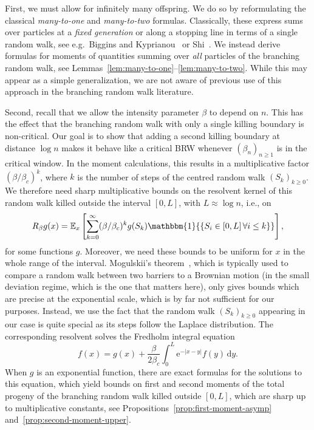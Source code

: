 \documentclass[a4paper, a4wide, 10pt, reqno]{amsart}
\theoremstyle{plain}
\theoremstyle{definition}
\numberwithin{equation}{section}
\newcommand{\E}{\mathbb E}
\newcommand{\re}{{\mathrm e}}
\newcommand{\Ind}[1]{\mathbbm{1}{\{#1\}}}
\newcommand{\rd}{\mathrm{d}}
\begin{document}
First, we must allow for infinitely many offspring. We do so by reformulating the classical \emph{many-to-one} and \emph{many-to-two} formulas. Classically, these express sums over particles at a \emph{fixed generation} or along a stopping line in terms of a single random walk, see e.g.\ Biggins and Kyprianou~\cite{Biggins2004} or Shi~\cite{ShiLectureNotes}. We instead derive  formulas for moments of quantities summing over \emph{all} particles of the branching random walk, see Lemmas~\ref{lem:many-to-one}--\ref{lem:many-to-two}. While this may appear as a simple generalization, we are not aware of previous use of this approach in the branching random walk literature.\pagebreak[3]
\smallskip

Second, recall that we allow the intensity parameter $\beta$ to depend on $n$. This has the effect that the branching random walk with only a single killing boundary is non-critical. Our goal is to show that
adding a second killing boundary at distance $\log n$ makes it behave like a critical BRW whenever $(\beta_n)_{n\ge 1}$ is in the critical window. In the moment calculations, this results in a multiplicative factor $(\beta/\beta_c)^k$, where $k$ is the number of steps of the centred random walk $(S_k)_{k\ge0}$.
We therefore need sharp multiplicative bounds on the resolvent kernel of this random walk killed outside the interval $[0,L]$, with $L \approx \log n$, i.e., on 
 \[
 R_\beta g(x) = \E_{x}\left[\sum_{k=0}^\infty (\beta/\beta_c)^k g(S_k)\Ind{S_i\in [0,L]\,\forall i\le k}\right],
 \]
 for some functions $g$. Moreover, we need these bounds to be uniform for $x$ in the whole range of the interval. Mogulskii's theorem~\cite{MogulskiiSmallDeviations1975}, which is typically used to compare a random walk between two barriers to a Brownian motion (in the small deviation regime, which is the one that matters here), only gives bounds which are precise at the exponential scale, which is by far not sufficient for our purposes. Instead, we use the fact that the random walk  $(S_k)_{k\ge0}$ appearing in our case is quite special as its steps follow the Laplace distribution. The corresponding resolvent solves the Fredholm integral equation 
\[
f(x) = g(x) + \frac{\beta}{2\beta_c}\int_0^L \re^{-|x-y|} f(y)\,\rd y.
\]
When $g$ is an exponential function, there are exact formulas for the solutions to this equation, which yield 
bounds on first and second moments of the total progeny of the branching random walk killed outside $[0,L]$, which are sharp up to multiplicative constants, see Propositions~\ref{prop:first-moment-asymp} and~\ref{prop:second-moment-upper}. 
\smallskip
\end{document}
